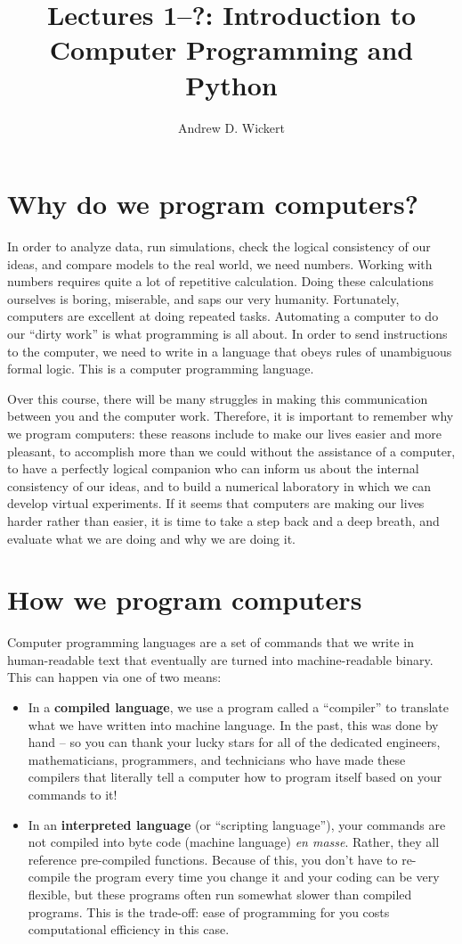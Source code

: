 \documentclass[a4paper,10pt]{amsart}
\title{Lectures 1--?: Introduction to Computer Programming and Python}
\author{Andrew D. Wickert}
\begin{document}
\maketitle

\section{Why do we program computers?}

In order to analyze data, run simulations, check the logical consistency of our ideas, and compare models to the real world, we need numbers. Working with numbers requires quite a lot of repetitive calculation. Doing these calculations ourselves is boring, miserable, and saps our very humanity. Fortunately, computers are excellent at doing repeated tasks. Automating a computer to do our ``dirty work'' is what programming is all about. In order to send instructions to the computer, we need to write in a language that obeys rules of unambiguous formal logic. This is a computer programming language.

Over this course, there will be many struggles in making this communication between you and the computer work. Therefore, it is important to remember why we program computers: these reasons include to make our lives easier and more pleasant, to accomplish more than we could without the assistance of a computer, to have a perfectly logical companion who can inform us about the internal consistency of our ideas, and to build a numerical laboratory in which we can develop virtual experiments. If it seems that computers are making our lives harder rather than easier, it is time to take a step back and a deep breath, and evaluate what we are doing and why we are doing it.

\section{How we program computers}

Computer programming languages are a set of commands that we write in human-readable text that eventually are turned into machine-readable binary. This can happen via one of two means:
\begin{itemize}
 \item In a \textbf{compiled language}, we use a program called a ``compiler'' to translate what we have written into machine language. In the past, this was done by hand -- so you can thank your lucky stars for all of the dedicated engineers, mathematicians, programmers, and technicians who have made these compilers that literally tell a computer how to program itself based on your commands to it!
 \item In an \textbf{interpreted language} (or ``scripting language''), your commands are not compiled into byte code (machine language) \textit{en masse}. Rather, they all reference pre-compiled functions. Because of this, you don't have to re-compile the program every time you change it and your coding can be very flexible, but these programs often run somewhat slower than compiled programs. This is the trade-off: ease of programming for you costs computational efficiency in this case.
\end{itemize}
\end{document}
